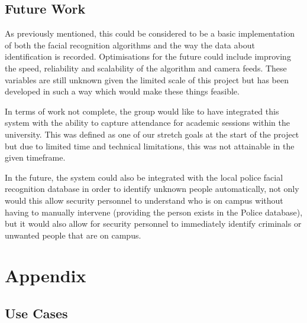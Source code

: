 \documentclass[
  english,
  a4paper,
,tablecaptionabove
]{scrartcl}
\begin{document}
\hypertarget{future-work}{%
\subsection{Future Work}\label{future-work}}

As previously mentioned, this could be considered to be a basic
implementation of both the facial recognition algorithms and the way the
data about identification is recorded. Optimisations for the future
could include improving the speed, reliability and scalability of the
algorithm and camera feeds. These variables are still unknown given the
limited scale of this project but has been developed in such a way which
would make these things feasible.

In terms of work not complete, the group would like to have integrated
this system with the ability to capture attendance for academic sessions
within the university. This was defined as one of our stretch goals at
the start of the project but due to limited time and technical
limitations, this was not attainable in the given timeframe.

In the future, the system could also be integrated with the local police
facial recognition database in order to identify unknown people
automatically, not only would this allow security personnel to
understand who is on campus without having to manually intervene
(providing the person exists in the Police database), but it would also
allow for security personnel to immediately identify criminals or
unwanted people that are on campus.

\newpage

\hypertarget{appendix}{%
\section{Appendix}\label{appendix}}

\hypertarget{use-cases}{%
\subsection{Use Cases}\label{use-cases}}
\end{document}
